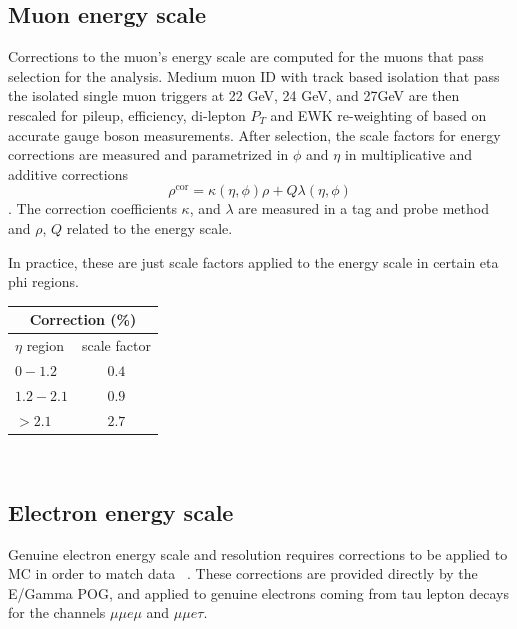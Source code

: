 \subsection{Muon energy scale}
Corrections to the muon's energy scale are computed for the muons that pass selection for the analysis. Medium muon ID with track based isolation that pass the isolated single muon triggers at 22 GeV, 24 GeV, and 27GeV are then rescaled for pileup, efficiency, di-lepton $P_T$ and EWK re-weighting of based on accurate gauge boson measurements. After selection, the scale factors for energy corrections are measured and parametrized in $\phi$ and $\eta$ in multiplicative and additive corrections 
\begin{equation}\rho^{\text{cor}}=\kappa(\eta,\phi)\rho+Q \lambda(\eta,\phi)\end{equation}. 
The correction coefficients $\kappa$, and $\lambda$ are measured in a tag and probe method and $\rho$, $Q$ related to the energy scale.

In practice, these are just scale factors applied to the energy scale in certain eta phi regions. \\
\begin{table}[h]
  \begin{center}
    \label{tab:MES}
    \begin{tabular} { l | c }
      \hline \multicolumn{2}{c}{Correction (\%)} \\
      \hline $\eta$ region & scale factor  \\ \hline
      $0 - 1.2$ & $0.4$ \\ 
      $1.2 - 2.1 $& $0.9 $\\ 
      $> 2.1$ & $2.7$ \\ 
    \end{tabular}
  \end{center}
\end{table}\\

\subsection{Electron energy scale}

Genuine electron energy scale and resolution requires corrections to be applied to MC in order to match data ~\cite{EGammaEnergyScale}. These corrections are provided directly by the E/Gamma POG, and applied to genuine electrons coming from tau lepton decays for the channels $\mu\mu e \mu$ and $\mu\mu e \tau$.


